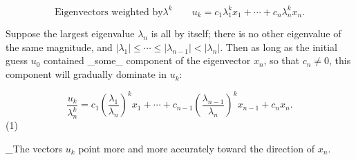 \[\text{{Eigenvectors weighted by}}\lambda^{k}\qquad u_{k}=c_{1}\lambda_{1}^{k}x_{1}+ \cdots+c_{n}\lambda_{n}^{k}x_{n}.\]

Suppose the largest eigenvalue \(\lambda_{n}\) is all by itself; there is no other eigenvalue of the same magnitude, and \(|\lambda_{1}|\leq\cdots\leq|\lambda_{n-1}|<|\lambda_{n}|\). Then as long as the initial guess \(u_{0}\) contained _some_ component of the eigenvector \(x_{n}\), so that \(c_{n}\neq 0\), this component will gradually dominate in \(u_{k}\):

\[\frac{u_{k}}{\lambda_{n}^{k}}=c_{1}\left(\frac{\lambda_{1}}{\lambda_{n}}\right) ^{k}x_{1}+\cdots+c_{n-1}\left(\frac{\lambda_{n-1}}{\lambda_{n}}\right)^{k}x_{ n-1}+c_{n}x_{n}.\] (1)

_The vectors \(u_{k}\) point more and more accurately toward the direction of \(x_{n}\).

